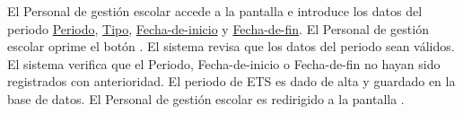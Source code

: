  \begin{UCtrayectoria}
 
     \UCpaso[\UCactor] El Personal de gestión escolar accede a la pantalla \label{CU25.introduceDatos} e introduce los datos del periodo \hyperlink{Periodo de ETS.Periodo }{Periodo}, \hyperlink{Periodo de ETS.Tipo }{Tipo}, \hyperlink{Periodo de ETS.Fecha-de-inicio }{Fecha-de-inicio} y \hyperlink{Periodo de ETS.Fecha-de-fin }{Fecha-de-fin}.
     \UCpaso[\UCactor] El Personal de gestión escolar oprime el botón .
     \UCpaso El sistema revisa que los datos del periodo sean válidos.
     \UCpaso El sistema verifica que el Periodo, Fecha-de-inicio o Fecha-de-fin no hayan sido registrados con anterioridad.
     \UCpaso El periodo de ETS es dado de alta y guardado en la base de datos.
     \UCpaso[\UCactor] El Personal de gestión escolar es redirigido a la pantalla .
 
 \end{UCtrayectoria}
 